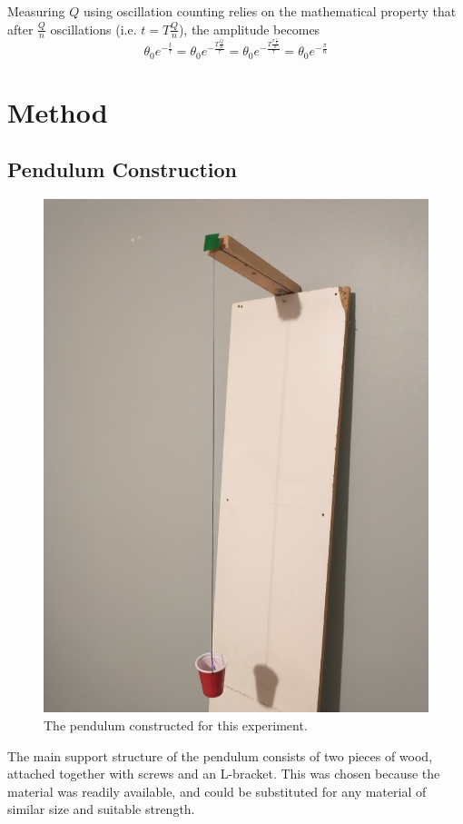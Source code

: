 \documentclass[aps,twocolumn,secnumarabic,nobalancelastpage,amsmath,amssymb,nofootinbib]{revtex4}
\begin{document}
Measuring \(Q\) using oscillation counting relies on the mathematical property that after \(\frac{Q}{n}\) oscillations
(i.e. \(t = T\frac{Q}{n}\)), the amplitude becomes
\begin{equation}
    \theta_0 e^{-\frac{t}{\tau}} = \theta_0 e^{-\frac{T\frac{Q}{n}}{\tau}} = \theta_0 e^{-\frac{T\frac{\pi\frac{\tau}{T}}{n}}{\tau}} = \theta_0 e^{-\frac{\pi}{n}}
\end{equation}


\section{Method}

\subsection{Pendulum Construction}

\begin{figure}[htb]
    \includegraphics[width=0.6\linewidth]{pendulum.png}
    \caption{The pendulum constructed for this experiment.}
\end{figure}

The main support structure of the pendulum consists of two pieces of wood, attached together with screws and an
L-bracket. This was chosen because the material was readily available, and could be substituted for any material of
similar size and suitable strength.
\end{document}
